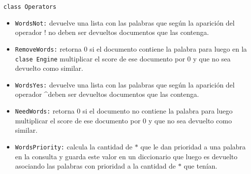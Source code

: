 \documentclass[a4paper, 12pt]{article}
\begin{document}
{\tt class Operators}
\begin{itemize}
    \item {\tt WordsNot:} devuelve una lista con las palabras que según la aparición del
          operador $!$ no deben ser devueltos documentos que las contenga.
    \item {\tt RemoveWords:} retorna 0 si el documento contiene la palabra para luego
          en la {\tt clase Engine} multiplicar el score de ese documento por 0 y que no sea
          devuelto como similar.
    \item {\tt WordsYes:} devuelve una lista con las palabras que según la aparición del
          operador \textasciicircum deben ser devueltos documentos que las contenga.
\end{itemize}


\begin{itemize}
    \item {\tt NeedWords:} retorna 0 si el documento no contiene la palabra para luego
          multiplicar el score de ese documento por 0 y que no sea devuelto como
          similar.
    \item {\tt WordsPriority:} calcula la cantidad de $*$ que le dan prioridad a una
          palabra en la consulta y guarda este valor en un diccionario que luego es
          devuelto asociando las palabras con prioridad a la cantidad de $*$ que tenían.
\end{itemize}
\end{document}
